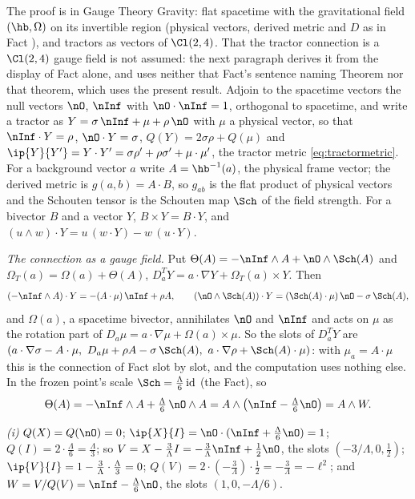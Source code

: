The proof is in Gauge Theory Gravity: flat spacetime with the gravitational field $(\hb, \Omega)$ on its invertible region (physical vectors, derived metric and $D$ as in Fact ), and tractors as vectors of $\Cl(2,4)$. That the tractor connection is a $\Cl(2,4)$ gauge field is not assumed: the next paragraph derives it from the display of Fact  alone, and uses neither that Fact's sentence naming Theorem  nor that theorem, which uses the present result. Adjoin to the spacetime vectors the null vectors $\nO$, $\nInf$ with $\nO \cdot \nInf = 1$, orthogonal to spacetime, and write a tractor as $Y = \sigma\,\nInf + \mu + \rho\,\nO$ with $\mu$ a physical vector, so that $\nInf \cdot Y = \rho$, $\nO \cdot Y = \sigma$, $Q(Y) = 2\sigma\rho + Q(\mu)$ and $\ip{Y}{Y'} = Y \cdot Y' = \sigma\rho' + \rho\sigma' + \mu \cdot \mu'$, the tractor metric \eqref{eq:tractormetric}. For a background vector $a$ write $A = \hb^{-1}(a)$, the physical frame vector; the derived metric is $g(a, b) = A \cdot B$, so $g_{ab}$ is the flat product of physical vectors and the Schouten tensor is the Schouten map $\Sch$ of the field strength. For a bivector $B$ and a vector $Y$, $B \times Y = B \cdot Y$, and $(u \wedge w) \cdot Y = u\,(w \cdot Y) - w\,(u \cdot Y)$.

\emph{The connection as a gauge field.} Put $\Theta(A) = -\nInf \wedge A + \nO \wedge \Sch(A)$ and $\Omega_{T}(a) = \Omega(a) + \Theta(A)$, $D^{T}_{a}Y = a \cdot \nabla Y + \Omega_{T}(a) \times Y$. Then
\[
(-\nInf \wedge A) \cdot Y = -(A \cdot \mu)\,\nInf + \rho A, \qquad (\nO \wedge \Sch(A)) \cdot Y = (\Sch(A) \cdot \mu)\,\nO - \sigma\,\Sch(A),
\]
and $\Omega(a)$, a spacetime bivector, annihilates $\nO$ and $\nInf$ and acts on $\mu$ as the rotation part of $D_{a}\mu = a \cdot \nabla \mu + \Omega(a) \times \mu$. So the slots of $D^{T}_{a}Y$ are $(a \cdot \nabla\sigma - A \cdot \mu,\ D_{a}\mu + \rho A - \sigma\,\Sch(A),\ a \cdot \nabla\rho + \Sch(A) \cdot \mu)$: with $\mu_{a} = A \cdot \mu$ this is the connection of Fact  slot by slot, and the computation uses nothing else. In the frozen point's scale $\Sch = \tfrac{\Lambda}{6}\,\mathrm{id}$ (the Fact), so
\[
\Theta(A) = -\nInf \wedge A + \tfrac{\Lambda}{6}\,\nO \wedge A = A \wedge \bigl(\nInf - \tfrac{\Lambda}{6}\nO\bigr) = A \wedge W .
\]

\emph{(i)} $Q(X) = Q(\nO) = 0$; $\ip{X}{I} = \nO \cdot (\nInf + \tfrac{\Lambda}{6}\nO) = 1$; $Q(I) = 2\cdot\tfrac{\Lambda}{6} = \tfrac{\Lambda}{3}$; so $V = X - \tfrac{3}{\Lambda}I = -\tfrac{3}{\Lambda}\nInf + \tfrac12\nO$, the slots $(-3/\Lambda, 0, \tfrac12)$; $\ip{V}{I} = 1 - \tfrac{3}{\Lambda}\cdot\tfrac{\Lambda}{3} = 0$; $Q(V) = 2\cdot(-\tfrac{3}{\Lambda})\cdot\tfrac12 = -\tfrac{3}{\Lambda} = -\ell^{2}$; and $W = V/Q(V) = \nInf - \tfrac{\Lambda}{6}\nO$, the slots $(1, 0, -\Lambda/6)$.

